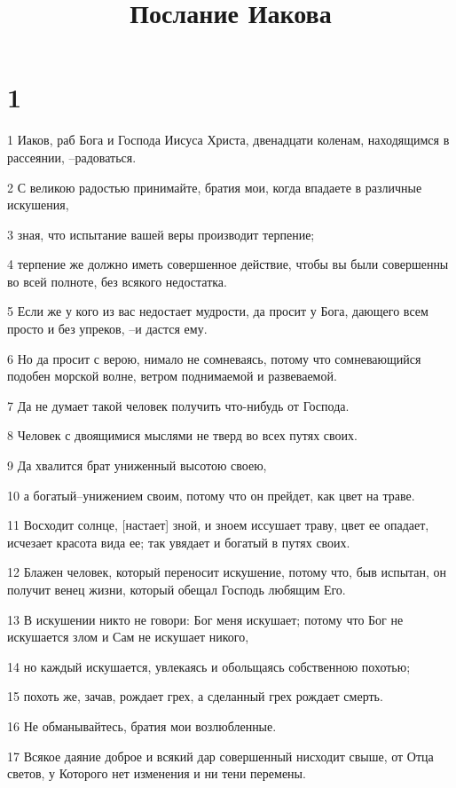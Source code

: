 

\title{Послание Иакова}


\chapter{1}

\par 1 Иаков, раб Бога и Господа Иисуса Христа, двенадцати коленам, находящимся в рассеянии, --радоваться.
\par 2 С великою радостью принимайте, братия мои, когда впадаете в различные искушения,
\par 3 зная, что испытание вашей веры производит терпение;
\par 4 терпение же должно иметь совершенное действие, чтобы вы были совершенны во всей полноте, без всякого недостатка.
\par 5 Если же у кого из вас недостает мудрости, да просит у Бога, дающего всем просто и без упреков, --и дастся ему.
\par 6 Но да просит с верою, нимало не сомневаясь, потому что сомневающийся подобен морской волне, ветром поднимаемой и развеваемой.
\par 7 Да не думает такой человек получить что-нибудь от Господа.
\par 8 Человек с двоящимися мыслями не тверд во всех путях своих.
\par 9 Да хвалится брат униженный высотою своею,
\par 10 а богатый--унижением своим, потому что он прейдет, как цвет на траве.
\par 11 Восходит солнце, [настает] зной, и зноем иссушает траву, цвет ее опадает, исчезает красота вида ее; так увядает и богатый в путях своих.
\par 12 Блажен человек, который переносит искушение, потому что, быв испытан, он получит венец жизни, который обещал Господь любящим Его.
\par 13 В искушении никто не говори: Бог меня искушает; потому что Бог не искушается злом и Сам не искушает никого,
\par 14 но каждый искушается, увлекаясь и обольщаясь собственною похотью;
\par 15 похоть же, зачав, рождает грех, а сделанный грех рождает смерть.
\par 16 Не обманывайтесь, братия мои возлюбленные.
\par 17 Всякое даяние доброе и всякий дар совершенный нисходит свыше, от Отца светов, у Которого нет изменения и ни тени перемены.
